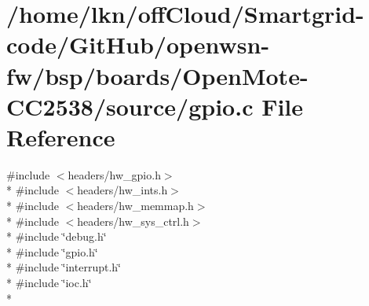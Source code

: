 \hypertarget{_open_mote-_c_c2538_2source_2gpio_8c}{}\section{/home/lkn/off\+Cloud/\+Smartgrid-\/code/\+Git\+Hub/openwsn-\/fw/bsp/boards/\+Open\+Mote-\/\+C\+C2538/source/gpio.c File Reference}
\label{_open_mote-_c_c2538_2source_2gpio_8c}
{\ttfamily \#include $<$headers/hw\+\_\+gpio.\+h$>$}\\*
{\ttfamily \#include $<$headers/hw\+\_\+ints.\+h$>$}\\*
{\ttfamily \#include $<$headers/hw\+\_\+memmap.\+h$>$}\\*
{\ttfamily \#include $<$headers/hw\+\_\+sys\+\_\+ctrl.\+h$>$}\\*
{\ttfamily \#include \char`\"{}debug.\+h\char`\"{}}\\*
{\ttfamily \#include \char`\"{}gpio.\+h\char`\"{}}\\*
{\ttfamily \#include \char`\"{}interrupt.\+h\char`\"{}}\\*
{\ttfamily \#include \char`\"{}ioc.\+h\char`\"{}}\\*
